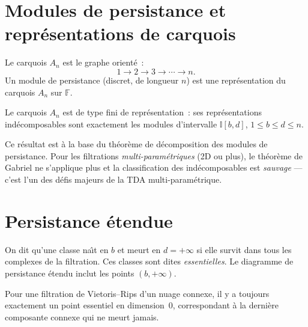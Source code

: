 \section{Modules de persistance et repr\'esentations de carquois}

\begin{definition}[Carquois $A_n$]
Le carquois $A_n$ est le graphe orient\'e~:
\[
  1 \to 2 \to 3 \to \cdots \to n.
\]
Un module de persistance (discret, de longueur $n$) est une
repr\'esentation du carquois $A_n$ sur $\mathbb{F}$.
\end{definition}

\begin{theoreme}[Gabriel, 1972]
Le carquois $A_n$ est de type fini de repr\'esentation~: ses
repr\'esentations ind\'ecomposables sont exactement les modules
d'intervalle $\mathbb{I}[b, d]$, $1 \leq b \leq d \leq n$.
\end{theoreme}

\begin{remarque}
Ce r\'esultat est \`a la base du th\'eor\`eme de d\'ecomposition des
modules de persistance. Pour les filtrations \emph{multi-param\'etriques}
(2D ou plus), le th\'eor\`eme de Gabriel ne s'applique plus et la
classification des ind\'ecomposables est \emph{sauvage} --- c'est l'un
des d\'efis majeurs de la TDA multi-param\'etrique.
\end{remarque}

\section{Persistance \'etendue}

\begin{definition}
On dit qu'une classe na\^{\i}t en $b$ et meurt en $d = +\infty$ si elle
survit dans tous les complexes de la filtration. Ces classes sont dites
\emph{essentielles}. Le diagramme de persistance \'etendu inclut les
points $(b, +\infty)$.
\end{definition}

\begin{proposition}
Pour une filtration de Vietoris--Rips d'un nuage connexe, il y a
toujours exactement un point essentiel en dimension~$0$, correspondant
\`a la derni\`ere composante connexe qui ne meurt jamais.
\end{proposition}


